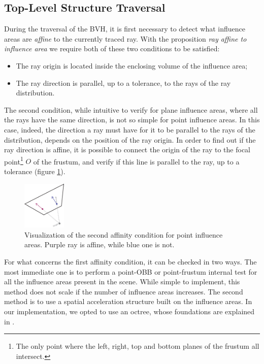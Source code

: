 \documentclass[acmtog, anonymous, review]{acmart}
\begin{document}
\subsection{Top-Level Structure Traversal} \label{ssec:top_lvl_traversal}
During the traversal of the BVH, it is first necessary to detect what influence areas are \textit{affine} to the currently traced ray. With the proposition \textit{ray affine to influence area} we require both of these two conditions to be satisfied:
\begin{itemize}
  \item The ray origin is located inside the enclosing volume of the influence area;
  \item The ray direction is parallel, up to a tolerance, to the rays of the ray distribution.
\end{itemize}

The second condition, while intuitive to verify for plane influence areas, where all the rays have the same direction, is not so simple for point influence areas. In this case, indeed, the direction a ray must have for it to be parallel to the rays of the distribution, depends on the position of the ray origin. In order to find out if the ray direction is affine, it is possible to connect the origin of the ray to the focal point\footnote{The only point where the left, right, top and bottom planes of the frustum all intersect.} $O$ of the frustum, and verify if this line is parallel to the ray, up to a tolerance (figure \ref{fig:direction_affinity}).

\begin{figure}
  \centering
  \includegraphics[width=0.185\textwidth]{Images/direction_affinity.png}
  \caption{Visualization of the second affinity condition for point influence areas. Purple ray is affine, while blue one is not.}
  \label{fig:direction_affinity} 
\end{figure}

For what concerns the first affinity condition, it can be checked in two ways. The most immediate one is to perform a point-OBB or point-frustum internal test for all the influence areas present in the scene. While simple to implement, this method does not scale if the number of influence areas increases. The second method is to use a spatial acceleration structure built on the influence areas. In our implementation, we opted to use an octree, whose foundations are explained in \cite{octree}.
\end{document}
